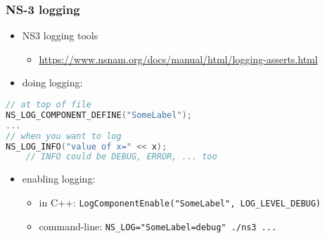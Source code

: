 \begin{FragileFrame}\frametitle{NS-3 logging}
    \begin{itemize}
    \item NS3 logging tools
        \begin{itemize}
        \item \url{https://www.nsnam.org/docs/manual/html/logging-asserts.html}
        \end{itemize}
    \item doing logging:
    \end{itemize}
\begin{lstlisting}[language=C++]
// at top of file
NS_LOG_COMPONENT_DEFINE("SomeLabel");
...
// when you want to log
NS_LOG_INFO("value of x=" << x);
    // INFO could be DEBUG, ERROR, ... too
\end{lstlisting}
    \begin{itemize}
    \item enabling logging:
        \begin{itemize}
        \item in C++: \texttt{LogComponentEnable("SomeLabel", LOG\_LEVEL\_DEBUG)}
        \item command-line: \texttt{NS\_LOG="SomeLabel=debug" ./ns3 ...}
        \end{itemize}
    \end{itemize}
\end{FragileFrame}
